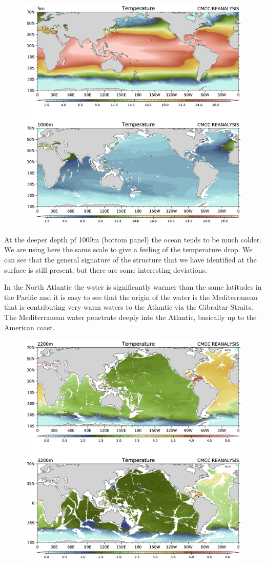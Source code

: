 \begin{figure}
	\centering
	\includegraphics[width = .7 \textwidth]{figs/GD/Temp5-1000.png}
	\caption{} \label{fig:}
\end{figure}

At the deeper depth pf 1000m (bottom panel) the ocean tends to be much
colder. We are using here the same scale to give a feeling of the
temperature drop. We can see that the general signature of the structure
that we have identified at the surface is still present, but there are
some interesting deviations.

In the North Atlantic the water is significantly warmer than the same
latitudes in the Pacific and it is easy to see that the origin of the
water is the Mediterranean that is contributing very warm waters to the
Atlantic via the Gibraltar Straits. The Mediterranean water penetrate
deeply into the Atlantic, basically up to the American coast.

\begin{figure}
	\centering
	\includegraphics[width = .7 \textwidth]{figs/GD/Temp2200-3200.png}
	\caption{} \label{fig:}
\end{figure}

